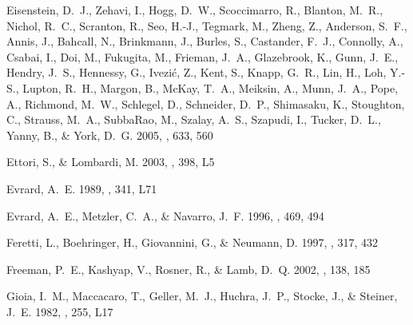 \documentclass[12pt,preprint]{aastex}
\begin{document}
\begin{thebibliography}{83}
{Eisenstein}, D.~J., {Zehavi}, I., {Hogg}, D.~W., {Scoccimarro}, R., {Blanton},
  M.~R., {Nichol}, R.~C., {Scranton}, R., {Seo}, H.-J., {Tegmark}, M., {Zheng},
  Z., {Anderson}, S.~F., {Annis}, J., {Bahcall}, N., {Brinkmann}, J., {Burles},
  S., {Castander}, F.~J., {Connolly}, A., {Csabai}, I., {Doi}, M., {Fukugita},
  M., {Frieman}, J.~A., {Glazebrook}, K., {Gunn}, J.~E., {Hendry}, J.~S.,
  {Hennessy}, G., {Ivezi{\'c}}, Z., {Kent}, S., {Knapp}, G.~R., {Lin}, H.,
  {Loh}, Y.-S., {Lupton}, R.~H., {Margon}, B., {McKay}, T.~A., {Meiksin}, A.,
  {Munn}, J.~A., {Pope}, A., {Richmond}, M.~W., {Schlegel}, D., {Schneider},
  D.~P., {Shimasaku}, K., {Stoughton}, C., {Strauss}, M.~A., {SubbaRao}, M.,
  {Szalay}, A.~S., {Szapudi}, I., {Tucker}, D.~L., {Yanny}, B., \& {York},
  D.~G. 2005, \apj, 633, 560

{Ettori}, S., \& {Lombardi}, M. 2003, \aap, 398, L5

{Evrard}, A.~E. 1989, \apjl, 341, L71

{Evrard}, A.~E., {Metzler}, C.~A., \& {Navarro}, J.~F. 1996, \apj, 469, 494

{Feretti}, L., {Boehringer}, H., {Giovannini}, G., \& {Neumann}, D. 1997, \aap,
  317, 432

{Freeman}, P.~E., {Kashyap}, V., {Rosner}, R., \& {Lamb}, D.~Q. 2002, \apjs,
  138, 185

{Gioia}, I.~M., {Maccacaro}, T., {Geller}, M.~J., {Huchra}, J.~P., {Stocke},
  J., \& {Steiner}, J.~E. 1982, \apjl, 255, L17


\end{thebibliography}
\end{document}
